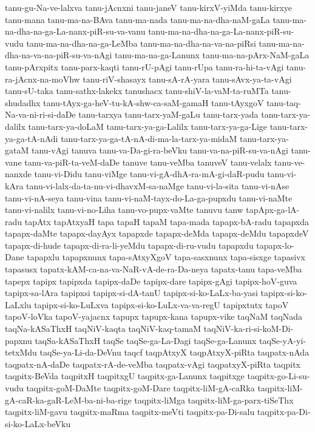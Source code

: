 {tanu-gu-Na-ve-lalxva
tanu-jAcnxni
tanu-janeV
tanu-kirxV-yiMda
tanu-kirxye
tanu-mana
tanu-ma-na-BAva
tanu-ma-nada
tanu-ma-na-dha-naM-gaLa
tanu-ma-na-dha-na-ga-La-nanx-piR-su-va-vanu
tanu-ma-na-dha-na-ga-La-nanx-piR-su-vudu
tanu-ma-na-dha-na-ga-LeMba
tanu-ma-na-dha-na-va-na-piRsi
tanu-ma-na-dha-na-va-na-piR-su-va-nAgi
tanu-ma-na-ga-Lanunx
tanu-ma-na-pArx-NaM-gaLa
tanu-pArxpitx
tanu-parx-kaqti
tanu-rU-pAgi
tanu-rUpa
tanu-ra-hi-ta-vAgi
tanu-ra-jAcnx-na-moVhw
tanu-riV-shasayx
tanu-sA-rA-yara
tanu-sAvx-ya-ta-vAgi
tanu-sU-taka
tanu-sathx-lakekx
tanushacx
tanu-shiV-la-vaM-ta-ruMTa
tanu-shudadhx
tanu-tAyx-ga-heV-tu-kA-shw-ca-saM-gamaH
tanu-tAyxgoV
tanu-taq-Na-va-ni-ri-si-daDe
tanu-tarxya
tanu-tarx-yaM-gaLu
tanu-tarx-yada
tanu-tarx-ya-dalilx
tanu-tarx-ya-doLaM
tanu-tarx-ya-ga-Lalilx
tanu-tarx-ya-ga-Lige
tanu-tarx-ya-ga-tA-nAdi
tanu-tarx-ya-ga-tA-nA-di-ma-la-tarx-ya-midaM
tanu-tarx-ya-gataM
tanu-vAgi
tanuva
tanu-va-Da-gi-ra-beVku
tanu-va-na-piR-su-va-nAgi
tanu-vane
tanu-va-piR-ta-veM-daDe
tanuve
tanu-veMba
tanuveV
tanu-velalx
tanu-ve-nanxde
tanu-vi-Didu
tanu-viMge
tanu-vi-gA-dhA-ra-mA-gi-daR-pudu
tanu-vi-kAra
tanu-vi-lalx-da-ta-nu-vi-dhavxM-sa-naMge
tanu-vi-la-sita
tanu-vi-nAse
tanu-vi-nA-seya
tanu-vina
tanu-vi-naM-tayx-do-La-ga-pupxdu
tanu-vi-naMte
tanu-vi-nalilx
tanu-vi-no-Liha
tanu-vo-pupx-vaMte
tanuvu
tanw
tapApx-ga-lA-radu
tapAtx
tapAtxyaH
tapa
tapaH
tapaM
tapa-mada
tapapx-bA-radu
tapapxda
tapapx-daMte
tapapx-dayAyx
tapapxde
tapapx-deMda
tapapx-deMdu
tapapxdeV
tapapx-di-hude
tapapx-di-ra-li-yeMdu
tapapx-di-ru-vudu
tapapxdu
tapapx-lo-Dane
tapapxlu
tapapxnunx
tapa-sAtxyXgoV
tapa-sasxnunx
tapa-sisxge
tapasivx
tapasusx
tapatx-kAM-ca-na-va-NaR-vA-de-ra-Da-neya
tapatx-tanu
tapa-veMba
tapepx
tapipx
tapipxda
tapipx-daDe
tapipx-dare
tapipx-gAgi
tapipx-hoV-guva
tapipx-sa-lAra
tapipxsi
tapipx-si-dA-tanU
tapipx-si-ko-LaLx-ba-yasi
tapipx-si-ko-LaLxlu
tapipx-si-ko-LuLxva
tapipx-si-ko-LuLx-va-va-regU
tapipxtutx
tapoV
tapoV-loVka
tapoV-yajacnx
tapupx
tapupx-kana
tapupx-vike
taqNaM
taqNada
taqNa-kASaThxH
taqNiV-kaqta
taqNiV-kaq-tamaM
taqNiV-ka-ri-si-koM-Di-papxnu
taqSa-kASaThxH
taqSe
taqSe-ga-La-Dagi
taqSe-ga-Lanunx
taqSe-yA-yi-tetxMdu
taqSe-ya-Li-da-DeVnu
taqcf
taqpAtxyX
taqpAtxyX-piRta
taqpatx-nAda
taqpatx-nA-daDe
taqpatx-rA-de-veMba
taqpatx-vAgi
taqpatxyX-piRta
taqpitx
taqpitx-BeVda
taqpitxH
taqpitxgU
taqpitx-ga-Lanunx
taqpitxge
taqpitx-go-Li-su-vudu
taqpitx-goM-DaMte
taqpitx-goM-Dare
taqpitx-liM-gA-caRka
taqpitx-liM-gA-caR-ka-gaR-LeM-ba-ni-ba-rige
taqpitx-liMga
taqpitx-liM-ga-parx-tiSeThx
taqpitx-liM-gavu
taqpitx-maRma
taqpitx-meVti
taqpitx-pa-Di-salu
taqpitx-pa-Di-si-ko-LaLx-beVku
}
